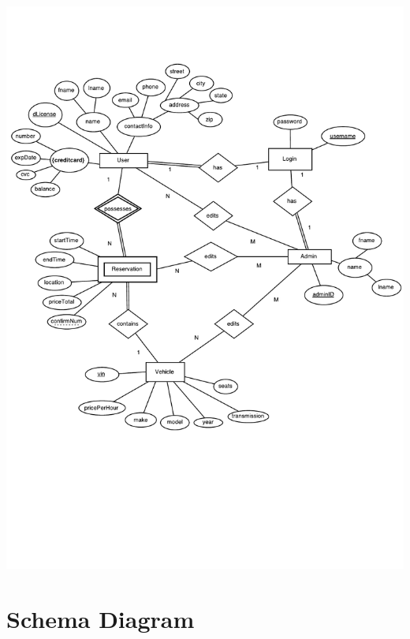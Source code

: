\documentclass[12pt]{article}
\begin{document}
\includegraphics[scale=0.8]{CarRentalERDiagram.pdf}

\section{Schema Diagram}
\end{document}
